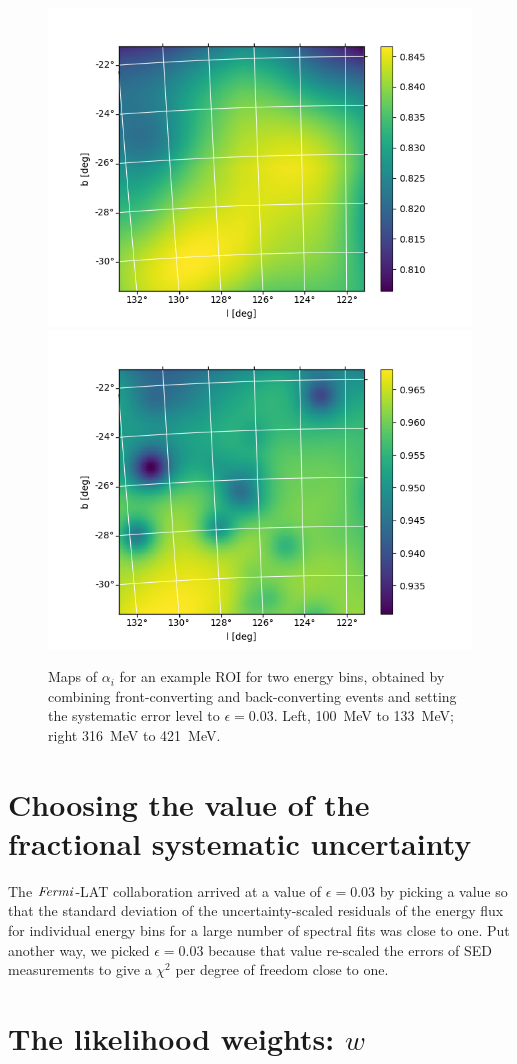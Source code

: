 \documentclass[preprint]{aastex}
\begin{document}
\begin{figure}[h]  
\begin{centering}
\includegraphics[width=0.49\columnwidth]{figures/alpha_E00_00.png}
\includegraphics[width=0.49\columnwidth]{figures/alpha_E01_04.png}
\vspace{-0.10in}
\caption{\label{fig:alpha}Maps of $\alpha_{i}$ for an example ROI
  for two energy bins, obtained by combining front-converting and 
  back-converting events and setting the systematic error level
  to $\epsilon = 0.03$.  Left, 100~MeV to 133~MeV; right 316~MeV to 421~MeV.}
\end{centering}
\end{figure}


\section{Choosing the value of the fractional systematic uncertainty}

The {$\it Fermi$}-LAT collaboration arrived at a value of $\epsilon = 0.03$ by 
picking a value so that the standard deviation of the uncertainty-scaled residuals 
of the energy flux for individual energy bins for a large number of spectral fits 
was close to one.  Put another way, we picked $\epsilon = 0.03$ because that value
re-scaled the errors of SED measurements to give a $\chi^2$ per degree of freedom 
close to one.


\section{The likelihood weights: \texorpdfstring{$w$}{w}}
\end{document}
